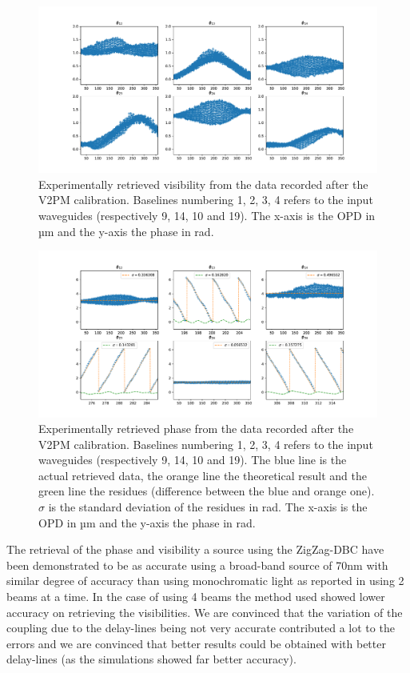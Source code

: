 \begin{figure}[htbp!]
 \centering
 \includegraphics[scale=.4]{../picture/retrieve_visi_4BL2.pdf}
 \caption{Experimentally retrieved visibility from the data recorded after the V2PM calibration. Baselines numbering 1, 2, 3, 4 refers to the input waveguides (respectively  9, 14, 10 and 19). The x-axis is the OPD in µm and the y-axis the phase in rad. }
 \label{fig:retrieved_visi_4BL2}
\end{figure}

\begin{figure}[htbp!]
 \centering
 \includegraphics[scale=.4]{../picture/retrieve_phase_4BL2.pdf}
 \caption{Experimentally retrieved phase from the data recorded after the V2PM calibration. Baselines numbering 1, 2, 3, 4 refers to the input waveguides (respectively  9, 14, 10 and 19). The blue line is the actual retrieved data, the orange line the theoretical result and the green line the residues (difference between the blue and orange one). $\sigma$ is the standard deviation of the residues in rad. The x-axis is the OPD in µm and the y-axis the phase in rad. }
 \label{fig:retrieved_phase_4BL2}
\end{figure}

The retrieval of the phase and visibility a source using the ZigZag-DBC have been demonstrated to be as accurate using a broad-band source of 70nm with similar degree of accuracy than using monochromatic light as reported in \cite{Diener2017} using 2 beams at a time. In the case of using 4 beams the method used showed lower accuracy on retrieving the visibilities. We are convinced that the variation of the coupling due to the delay-lines being not very accurate contributed a lot to the errors and we are convinced that better results could be obtained with better delay-lines (as the simulations showed far better accuracy).   
